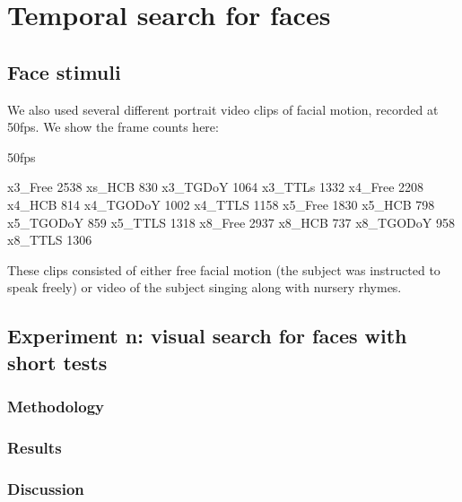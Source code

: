 \chapter{Temporal search for faces}

\section{Face stimuli}

We also used several different portrait video clips of facial motion, recorded at 50fps. We show the frame counts here:

50fps

x3\_Free	2538
xs\_HCB		830
x3\_TGDoY	1064
x3\_TTLs	1332
x4\_Free	2208
x4\_HCB		814
x4\_TGODoY	1002
x4\_TTLS	1158
x5\_Free	1830
x5\_HCB		798
x5\_TGODoY	859
x5\_TTLS	1318
x8\_Free	2937
x8\_HCB		737
x8\_TGODoY	958
x8\_TTLS	1306

These clips consisted of either free facial motion (the subject was instructed to speak freely) or video of the subject singing along with nursery rhymes.

\section{Experiment n: visual search for faces with short tests}

\subsection{Methodology}

\subsection{Results}

\subsection{Discussion}